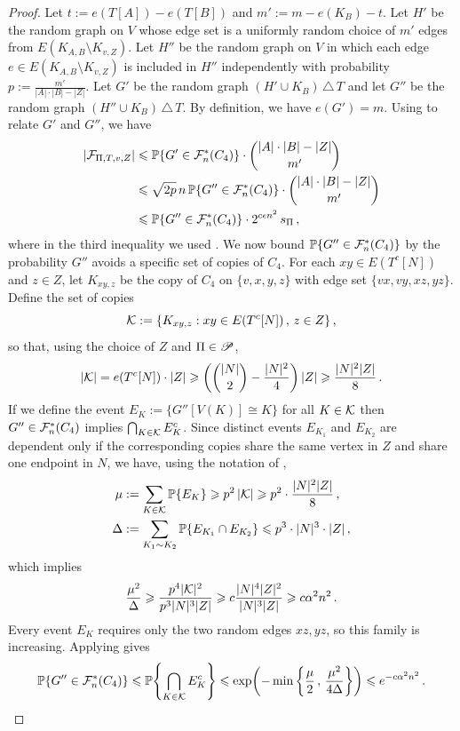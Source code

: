 \begin{proof}
Let $t:=e(T[A])-e(T[B])$ and $m':=m-e(K_B)-t$. Let $H'$ be the random graph on $V$ whose edge set is a uniformly random choice of $m'$ edges from $E(K_{A,B}\setminus K_{v,Z})$. Let $H''$ be the random graph on $V$ in which each edge $e\in E(K_{A,B}\setminus K_{v,Z})$ is included in $H''$ independently with probability $p:=\frac{m'}{|A|\cdot|B|-|Z|}$. Let $G'$ be the random graph $(H'\cup K_B)\,\triangle\,T$ and let $G''$ be the random graph $(H''\cup K_B)\,\triangle\,T$. By definition, we have $e(G')=m$. Using \cite[Lemma~A.4]{perkins2025typical} to relate $G'$ and $G''$, we have
\begin{align}
|{\mathcal F}_{\Pi,T,v,Z}| &\leqslant {\mathbb P}\{G'\in{\mathcal F}^\ast_n(C_4)\}\cdot\binom{|A|\cdot|B|-|Z|}{m'} \nonumber\\
&\leqslant \sqrt{2p}\,n\,{\mathbb P}\{G''\in{\mathcal F}^\ast_n(C_4)\}\cdot\binom{|A|\cdot|B|-|Z|}{m'} \nonumber\\
&\leqslant {\mathbb P}\{G''\in{\mathcal F}^\ast_n(C_4)\} \cdot 2^{c\epsilon n^2}\,s_\Pi \,,\label{eqn:G''-PiTvZ-bd}
\end{align}
where in the third inequality we used \cite[Lemma~A.1(i),(ii),(iii)]{perkins2025typical}.
We now bound ${\mathbb P}\{G''\in{\mathcal F}^\ast_n(C_4)\}$ by the probability $G''$ avoids a specific set of copies of $C_4$. For each $xy\in E(T^c[N])$ and $z\in Z$, let $K_{xy,z}$ be the copy of $C_4$ on $\{v,x,y,z\}$ with edge set $\{vx,vy,xz,yz\}$. Define the set of copies
$${\mathcal K}:=\{K_{xy,z}:xy\in E(T^c[N])\,,\, z\in Z\}\,,$$
so that, using the choice of $Z$ and $\Pi\in{\mathscr P}$,
$$|{\mathcal K}|=e(T^c[N])\cdot|Z|\geqslant\left(\binom{|N|}{2}-\frac{|N|^2}{4}\right)|Z|\geqslant \frac{|N|^2|Z|}{8}\,.$$
If we define the event $E_K:=\{G''[V(K)]\cong K\}$ for all $K\in{\mathcal K}$ then $G''\in{\mathcal F}^\ast_n(C_4)$ implies $\bigcap_{K\in{\mathcal K}}E_K^c$. Since distinct events $E_{K_1}$ and $E_{K_2}$ are dependent only if the corresponding copies share the same vertex in $Z$ and share one endpoint in $N$, we have, using the notation of ,
\begin{align*}
\mu &:= \sum_{K\in{\mathcal K}}{\mathbb P}\{E_K\} \geqslant p^2\,|{\mathcal K}| \geqslant p^2\cdot\frac{|N|^2|Z|}{8} \,, \\
\Delta &:= \sum_{K_1\sim K_2}{\mathbb P}\{E_{K_1}\cap E_{K_2}\}\leqslant p^3\cdot|N|^3\cdot|Z|\,,
\end{align*}
which implies
$$\frac{\mu^2}{\Delta}\geqslant \frac{p^4|{\mathcal K}|^2}{p^3|N|^3|Z|}\geqslant c\frac{|N|^4|Z|^2}{|N|^3|Z|}\geqslant c\alpha^2n^2\,.$$
Every event $E_K$ requires only the two random edges $xz,yz$, so this family is increasing. Applying  gives
\begin{equation}\label{eqn:G''-pitvz-janson}
{\mathbb P}\{G''\in{\mathcal F}^\ast_n(C_4)\} \leqslant {\mathbb P}\!\left\{\bigcap_{K\in{\mathcal K}}E_K^c\right\} \leqslant \exp\!\left(-\min\left\{\frac{\mu}{2}\,,\,\frac{\mu^2}{4\Delta}\right\}\right) \leqslant e^{-c\alpha^2n^2}\,.
\end{equation}


\end{proof}
